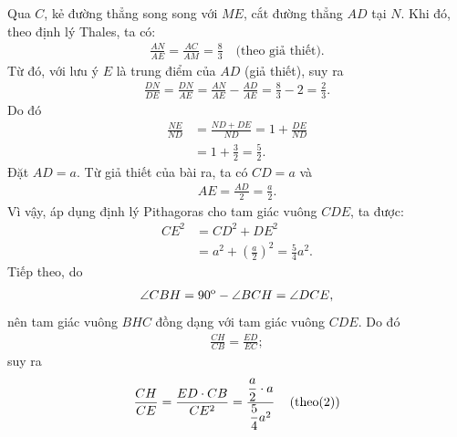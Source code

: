 \begin{multicols}{2}
\begin{figure}[H]
		\vspace*{-10pt}
	\end{figure}
	Qua $C$, kẻ đường thẳng song song với $ME$, cắt đường thẳng $AD$ tại $N$.
	\vskip 0.05cm
	Khi đó, theo định lý Thales, ta có:
	\begin{align*}
		\frac{{AN}}{{AE}} = \frac{{AC}}{{AM}} = \frac{8}{3} \quad\text{(theo giả thiết).}
	\end{align*}
	Từ đó, với lưu ý $E$ là trung điểm của $AD$ (giả thiết), suy ra
	\begin{align*}
		\frac{{DN}}{{DE}} = \frac{{DN}}{{AE}} = \frac{{AN}}{{AE}} - \frac{{AD}}{{AE}} = \frac{8}{3} - 2 = \frac{2}{3}.
	\end{align*}
	Do đó
	\begin{align*}
		\frac{{NE}}{{ND}} &= \frac{{ND + DE}}{{ND}} = 1 + \frac{{DE}}{{ND}} \\
		&= 1 + \frac{3}{2} = \frac{5}{2}. \tag{$1$}
	\end{align*}
	Đặt $AD = a$. Từ giả thiết của bài ra, ta có $CD = a$ và
	\begin{align*}
		AE = \frac{{AD}}{2} = \frac{a}{2}.
	\end{align*}
	Vì vậy, áp dụng định lý Pithagoras cho tam giác vuông $CDE$, ta được:
	\begin{align*}
		C{E^2} &= C{D^2} + D{E^2} \\
		&= {a^2} + {\left( {\frac{a}{2}} \right)^2} = \frac{5}{4}{a^2}. \tag{$2$}
	\end{align*}
	Tiếp theo, do
	\begin{align*}
		\angle CBH = {90^{\rm{o}}} - \angle BCH = \angle DCE,
	\end{align*}
	nên tam giác vuông $BHC$ đồng dạng với tam giác vuông $CDE$. Do đó
	\begin{align*}
		\frac{{CH}}{{CB}} = \frac{{ED}}{{EC}};
	\end{align*}
	suy ra
	\begin{align*}
			\frac{{CH}}{{CE}} = \frac{{ED \cdot CB}}{{C{E^2}}} = \frac{{\dfrac{a}{2} \cdot a}}{{\dfrac{5}{4}{a^2}}}\quad\left( {{\rm{theo}}(2)} \right)\\

\end{align*}
\end{multicols}
